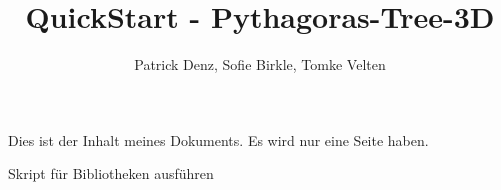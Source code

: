 \documentclass[a4paper,12pt]{article} %
\title{QuickStart - Pythagoras-Tree-3D}               %
\author{Patrick Denz, Sofie Birkle, Tomke Velten}          %
\date{}                          %
\begin{document}
\maketitle                      %
Dies ist der Inhalt meines Dokuments. Es wird nur eine Seite haben.

Skript für Bibliotheken ausführen

\end{document}
